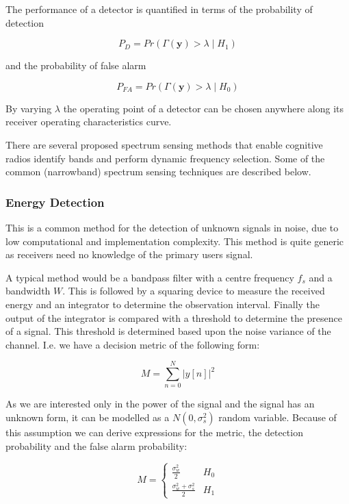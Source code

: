 The performance of a detector is quantified in terms of the probability of detection

\begin{equation}
P_{D} = Pr\left( \Gamma\left(\textbf{y}\right) > \lambda \mid H_1\right)
\end{equation}

and the probability of false alarm 

\begin{equation}
P_{FA} = Pr\left( \Gamma\left(\textbf{y}\right) > \lambda \mid H_0\right)
\end{equation}

By varying \(\lambda\) the operating point of a detector can be chosen anywhere along its receiver operating characteristics curve.

There are several proposed spectrum sensing methods that enable cognitive radios identify bands and perform dynamic frequency selection. Some of the common (narrowband) spectrum sensing techniques are described below.

\subsubsection{Energy Detection}
This is a common method for the detection of unknown signals in noise, due to low computational and implementation complexity. This method is quite generic as receivers need no knowledge of the primary users signal. 

A typical method would be a bandpass filter with a centre frequency \(f_{s}\) and a bandwidth \(W\). This is followed by a squaring device to measure the received energy and an integrator to determine the observation interval. Finally the output of the integrator is compared with a threshold to determine the presence of a signal. This threshold is determined based upon the noise variance of the channel. I.e. we have a decision metric of the following form:

\begin{equation}
M = \sum_{n=0}^N |y\left[n\right]|^2
\end{equation}

As we are interested only in the power of the signal and the signal has an unknown form, it can be modelled as a \(N\left(0, \sigma_s^2\right)\) random variable. Because of this assumption we can derive expressions for the metric, the detection probability and the false alarm probability:

\begin{equation}
 M =
  \begin{cases}
   \frac{\sigma_w^2}{2} & H_0 \\
   \frac{\sigma_w^2 + \sigma_s^2}{2} & H_1
  \end{cases}
\end{equation}

